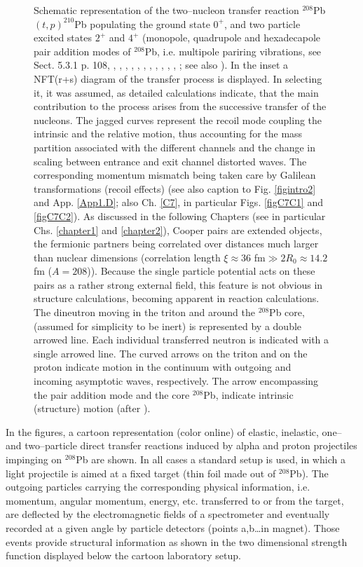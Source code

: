 \begin{figure}
\caption{Schematic representation of the two--nucleon transfer reaction $^{208}$Pb$(t,p)^{210}$Pb populating the ground state $0^+$, and two particle excited states $2^+$ and $4^+$ (monopole, quadrupole and hexadecapole pair addition modes of $^{208}$Pb, i.e. multipole pariring vibrations, see \cite{Brink:05} Sect. 5.3.1 p. 108, \cite{Broglia:74}, \cite{Ragnarsson:76}, \cite{Broglia:71b}, \cite{Broglia:71c}, \cite{Bes:71d}, \cite{Bes:71}, \cite{Flynn:71}, \cite{Bes:72}, \cite{Broglia:81c}, \cite{Bohr:74b}, \cite{Flynn:72}, \cite{Bortignon:76}; see also \cite{Kubo:70}). In the inset a NFT(r+s) diagram of the transfer process is displayed. In selecting it, it was  assumed, as detailed calculations indicate, that the main contribution to the process arises from the successive transfer of the nucleons. The jagged curves represent the recoil  mode coupling the intrinsic and the relative motion,  thus accounting for the mass partition associated with the different channels and the change in scaling between entrance and exit channel distorted waves. The corresponding momentum mismatch being taken care by Galilean transformations (recoil effects) (see also caption to Fig. \ref{figintro2} and App. \ref{App1.D}; also Ch. \ref{C7}, in particular Figs. \ref{figC7C1} and \ref{figC7C2}). As discussed in the following Chapters (see in particular Chs. \ref{chapter1} and \ref{chapter2}), Cooper pairs are extended objects, the fermionic partners being correlated over distances much larger than nuclear dimensions (correlation length $\xi\approx36$ fm$\gg 2R_0\approx 14.2$ fm ($A=208$)). Because the single particle potential acts on these pairs as a rather strong external field, this feature is not obvious in structure calculations, becoming apparent in reaction calculations. The dineutron moving in the triton and around the $^{208}$Pb core, (assumed for simplicity to be inert) is represented by a double arrowed line. Each individual transferred neutron is indicated with a single arrowed line. The curved arrows on the triton and on the proton indicate motion in the continuum with outgoing and incoming asymptotic waves, respectively. The arrow encompassing the pair addition mode and the core $^{208}$Pb, indicate intrinsic (structure) motion (after \cite{Mottelson:76b}).}
\label{figintro3}
\end{figure}

In the figures, a cartoon representation (color online) of elastic, inelastic, one-- and two--particle direct transfer reactions induced by alpha and proton projectiles impinging on $^{208}$Pb are shown. In all cases a standard setup is used, in which a light projectile is aimed at a fixed target (thin foil made out of $^{208}$Pb). The outgoing particles carrying the corresponding physical information, i.e. momentum, angular momentum, energy, etc. transferred to or from the target, are deflected by the electromagnetic fields of a spectrometer and eventually recorded at a given angle by particle detectors (points a,b\dots in magnet). Those events provide structural information as shown in the two dimensional strength function displayed below the cartoon laboratory setup. 

